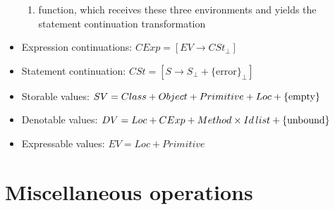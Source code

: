 \documentclass[11pt,a4paper,twoside]{article}
\begin{document}
\begin{itemize}
\begin{enumerate}
\item function, which receives these three environments and yields the statement continuation transformation
\end{enumerate}
\item Expression continuations: $CExp = [EV\rightarrow CSt_{\bot}]$
\item Statement continuation: $CSt = [S\rightarrow S_{\bot} + \{\mathrm{error}\}_{\bot}]$
\item Storable values: $SV = Class + Object + Primitive + Loc + \{\mathrm{empty}\}$
\item Denotable values: $DV = Loc + CExp + Method\times Id\,list + \{\mathrm{unbound}\}$
\item Expressable values: $EV = Loc + Primitive$
\end{itemize}
\section{Miscellaneous operations}
\end{document}
